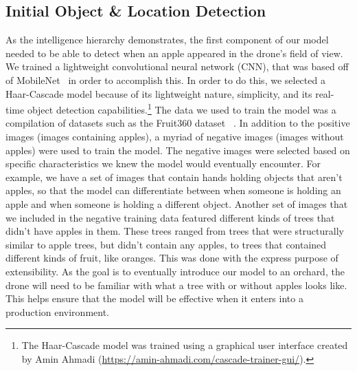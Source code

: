 \subsection{Initial Object \& Location Detection}\label{subsec:initial-object
-&-location-detection}
As the intelligence hierarchy demonstrates, the first component of our model needed
to be able to detect when an apple appeared in the drone's field of view.
We trained a lightweight convolutional neural network (CNN), that was based off of
MobileNet~\cite{Sandler2018,PyTorchMobileNet} in order to accomplish this.
In order to do this, we selected a Haar-Cascade model because of its lightweight
nature, simplicity, and its real-time object detection capabilities.\footnote{The
Haar-Cascade model was trained using a graphical user interface created by Amin
Ahmadi (\url{https://amin-ahmadi.com/cascade-trainer-gui/}).}
The data we used to train the model was a compilation of datasets such as the
Fruit360 dataset ~\cite{Fruit360}.
In addition to the positive images (images containing apples), a myriad of negative
images (images without apples) were used to train the model.
The negative images were selected based on specific characteristics we knew the model
would eventually encounter.
For example, we have a set of images that contain hands holding objects that aren't
apples, so that the model can differentiate between when someone
is holding an apple and when someone is holding a different object.
Another set of images that we included in the negative training data featured
different kinds of trees that didn't have apples in them.
These trees ranged from trees that were structurally similar to apple trees, but
didn't contain any apples, to trees that contained different kinds of fruit, like
oranges.
This was done with the express purpose of extensibility.
As the goal is to eventually introduce our model to an orchard, the drone will need
to be familiar with what a tree with or without apples looks like.
This helps ensure that the model will be effective when it enters into a production
environment.
